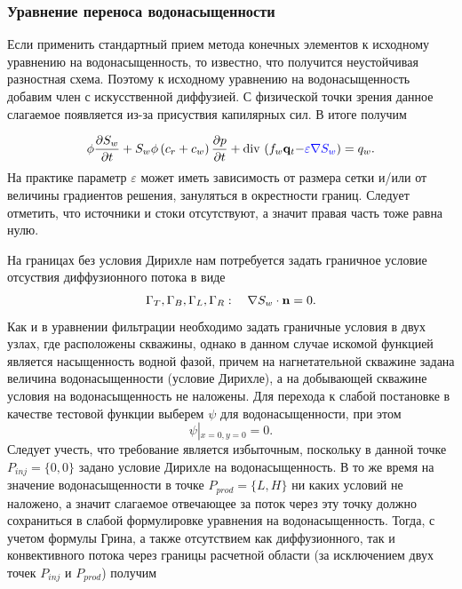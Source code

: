 \subsubsection{Уравнение переноса водонасыщенности}

Если применить стандартный прием метода конечных элементов к исходному уравнению на водонасыщенность, то известно, что получится неустойчивая разностная схема. 
Поэтому к исходному уравнению на водонасыщенность добавим член с искусственной диффузией. С физической точки зрения данное слагаемое появляется из-за присуствия капилярных сил. В итоге получим 

\begin{equation}\label{eq:satur_diffusion}
	\phi \dfrac{\partial S_w}{\partial t} + S_w\phi\left(c_r + c_w \right)\dfrac{\partial p}{\partial t} + \operatorname{div}\, \left( f_w \mathbf{q}_t {- \color{blue}\varepsilon \nabla S_w} \right) = 
	q_w.
\end{equation}
На практике параметр $\varepsilon$ может иметь зависимость от размера сетки и/или от 
величины градиентов решения, зануляться в окрестности границ. Следует отметить, что источники и стоки
отсутствуют, а значит правая часть  тоже равна нулю.

На границах без условия Дирихле нам потребуется задать граничное условие отсуствия диффузионного потока в виде
\begin{equation}\label{eq:GammaTBLR_Sw_diffusion}
	\Gamma_T, \Gamma_B, \Gamma_L, \Gamma_R: \quad \nabla S_w \cdot \mathbf{n} = 0.
\end{equation}
Как и в уравнении фильтрации необходимо задать граничные условия в двух узлах, где расположены скважины,
однако в данном случае искомой функцией является насыщенность водной фазой, причем на нагнетательной скважине
задана величина водонасыщенности (условие Дирихле), а на добывающей скважине условия на водонасыщенность не наложены.
Для перехода к слабой постановке в качестве тестовой функции выберем $\psi$ для водонасыщенности, при этом 
\begin{equation}\label{eq:psi_equal_zero}
	\psi\left|_{x=0, y=0}\right. = 0.
\end{equation}
Следует учесть, что требование  является избыточным, поскольку в данной 
точке $P_{inj}=\{0,0\}$ задано условие Дирихле на водонасыщенность. В то же время на значение водонасыщенности в точке
$P_{prod}=\{L,H\}$ ни каких условий не наложено, а значит слагаемое отвечающее за поток через эту точку
должно сохраниться в слабой формулировке уравнения на водонасыщенность.
Тогда, с учетом формулы Грина, а также отсутствием как диффузионного, так и конвективного потока через границы
расчетной области (за исключением двух точек $P_{inj}$ и $P_{prod}$) получим

